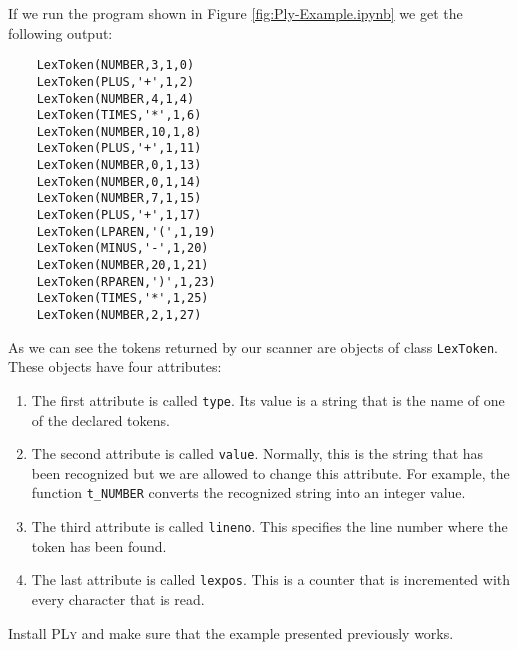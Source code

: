 \noindent
If we run the program shown in Figure \ref{fig:Ply-Example.ipynb} we get the following output:
\begin{verbatim}
    LexToken(NUMBER,3,1,0)
    LexToken(PLUS,'+',1,2)
    LexToken(NUMBER,4,1,4)
    LexToken(TIMES,'*',1,6)
    LexToken(NUMBER,10,1,8)
    LexToken(PLUS,'+',1,11)
    LexToken(NUMBER,0,1,13)
    LexToken(NUMBER,0,1,14)
    LexToken(NUMBER,7,1,15)
    LexToken(PLUS,'+',1,17)
    LexToken(LPAREN,'(',1,19)
    LexToken(MINUS,'-',1,20)
    LexToken(NUMBER,20,1,21)
    LexToken(RPAREN,')',1,23)
    LexToken(TIMES,'*',1,25)
    LexToken(NUMBER,2,1,27)
\end{verbatim}
As we can see the tokens returned by our scanner are objects of class \texttt{LexToken}.  These objects have
four attributes:
\begin{enumerate}
\item The first attribute is called \texttt{type}.  Its value is a string that is the name of
      one of the declared tokens.
\item The second attribute is called \texttt{value}.  Normally, this is the string that has been 
      recognized but we are allowed to change this attribute.  For example, the function \texttt{t\_NUMBER}
      converts the recognized string into an integer value.
\item The third attribute is called \texttt{lineno}.  This specifies the line number where the token has been found.
\item The last attribute is called \texttt{lexpos}.  This is a counter that is incremented with every
      character that is read.
\end{enumerate}

\homeworkEng
Install \textsc{PLy} and make sure that the example presented previously works.  

